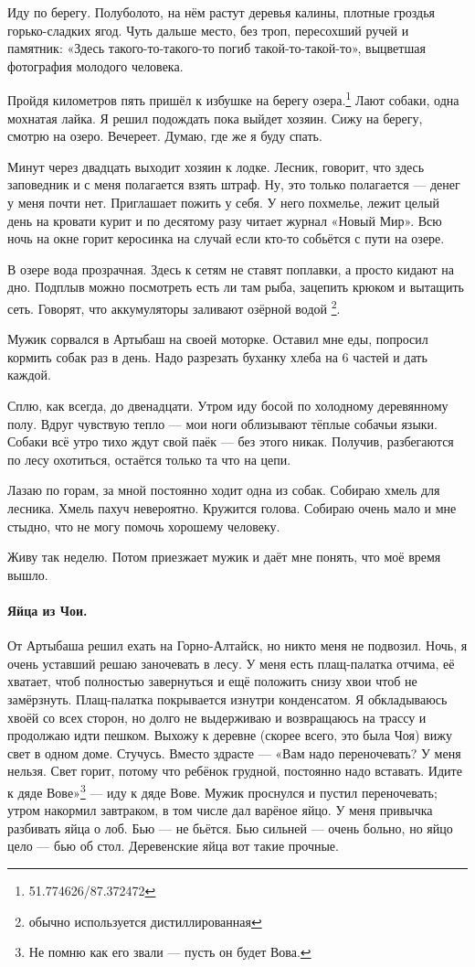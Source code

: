 \documentclass{book}
\begin{document}
Иду по берегу.
Полуболото, на нём растут деревья калины,
плотные гроздья горько-сладких ягод.
Чуть дальше место, без троп, пересохший ручей и памятник:
«Здесь такого-то-такого-то погиб такой-то-такой-то»,
выцветшая фотография молодого человека.

Пройдя километров пять пришёл к избушке на берегу озера.\footnote{51.774626/87.372472}
Лают собаки, одна мохнатая лайка.
Я решил подождать пока выйдет хозяин.
Сижу на берегу, смотрю на озеро.
Вечереет.
Думаю, где же я буду спать.

Минут через двадцать выходит хозяин к лодке.
Лесник, говорит, что здесь заповедник и с меня полагается взять штраф.
Ну, это только полагается --- денег у меня почти нет.
Приглашает пожить у себя.
У него похмелье, лежит целый день на кровати курит и по десятому разу читает журнал «Новый Мир».
Всю ночь на окне горит керосинка на случай если кто-то собьётся с пути на озере.

В озере вода прозрачная.
Здесь к сетям не ставят поплавки, а просто кидают на дно.
Подплыв можно посмотреть есть ли там рыба, зацепить крюком и вытащить сеть.
Говорят, что аккумуляторы заливают озёрной водой%
\footnote{обычно используется дистиллированная}.

Мужик сорвался в Артыбаш на своей моторке.
Оставил мне еды, попросил кормить собак раз в день.
Надо разрезать буханку хлеба на 6 частей и дать каждой.

Сплю, как всегда, до двенадцати.
Утром иду босой по холодному деревянному полу.
Вдруг чувствую тепло --- мои ноги облизывают тёплые собачьи языки.
Собаки всё утро тихо ждут свой паёк --- без этого никак.
Получив, разбегаются по лесу охотиться,
остаётся только та что на цепи.

Лазаю по горам, за мной постоянно ходит одна из собак.
Собираю хмель для лесника.
Хмель пахуч невероятно.
Кружится голова.
Собираю очень мало и мне стыдно, что не могу помочь хорошему человеку.

Живу так неделю.
Потом приезжает мужик и даёт мне понять, что моё время вышло.

\paragraph{Яйца из Чои.}
От Артыбаша решил ехать на Горно-Алтайск, но никто меня не подвозил.
Ночь, я очень уставший решаю заночевать в лесу.
У меня есть плащ-палатка отчима, её хватает, чтоб полностью завернуться и ещё положить снизу хвои чтоб не замёрзнуть.
Плащ-палатка покрывается изнутри конденсатом.
Я обкладываюсь хвоёй со всех сторон, но долго не выдерживаю и возвращаюсь на трассу и продолжаю идти пешком.
Выхожу к деревне (скорее всего, это была Чоя) вижу свет в одном доме.
Стучусь.
Вместо здрасте --- «Вам надо переночевать?
У меня нельзя.
Свет горит, потому что ребёнок грудной, постоянно надо вставать.
Идите к дяде Вове»\footnote{Не помню как его звали --- пусть он будет Вова.} --- иду к дяде Вове.
Мужик проснулся и пустил переночевать; утром накормил завтраком, в том числе дал варёное яйцо.
У меня привычка разбивать яйца о лоб.
Бью --- не бьётся. 
Бью сильней --- очень больно, но яйцо цело --- бью об стол.
Деревенские яйца вот такие прочные.
\end{document}
